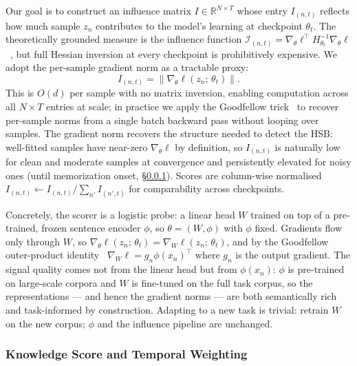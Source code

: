 \begin{foldable} %
	Our goal is to construct an influence matrix $I \in \mathbb{R}^{N \times T}$ whose entry $I_{(n,t)}$ reflects how much sample $z_n$ contributes to the model's learning at checkpoint $\theta_t$.
	The theoretically grounded measure is the influence function $\mathcal{I}_{(n,t)} = \nabla_\theta \ell^\top H_{\theta_t}^{-1} \nabla_\theta \ell$~\cite{koh2017understanding}, but full Hessian inversion at every checkpoint is prohibitively expensive.
	We adopt the per-sample gradient norm as a tractable proxy:
	\begin{equation}
		I_{(n,t)} = \|\nabla_\theta \ell(z_n;\,\theta_t)\|.
		\label{ch5:eq:influence-matrix}
	\end{equation}
	This is $O(d)$ per sample with no matrix inversion, enabling computation across all $N \times T$ entries at scale; in practice we apply the Goodfellow trick~\cite{goodfellow2015efficient} to recover per-sample norms from a single batch backward pass without looping over samples.
	The gradient norm recovers the structure needed to detect the HSB: well-fitted samples have near-zero $\nabla_\theta \ell$ by definition, so $I_{(n,t)}$ is naturally low for clean and moderate samples at convergence and persistently elevated for noisy ones (until memorization onset, \S\ref{ch5:sec:04-gradient-kappa}).
	Scores are column-wise normalised $I_{(n,t)} \leftarrow I_{(n,t)} / \sum_{n'} I_{(n',t)}$ for comparability across checkpoints.

	Concretely, the scorer is a logistic probe: a linear head $W$ trained on top of a pre-trained, frozen sentence encoder $\phi$, so $\theta = (W, \phi)$ with $\phi$ fixed.
	Gradients flow only through $W$, so $\nabla_\theta \ell(z_n;\,\theta_t) = \nabla_W \ell(z_n;\,\theta_t)$, and by the Goodfellow outer-product identity~\cite{goodfellow2015efficient} $\nabla_W \ell = g_n \phi(x_n)^\top$ where $g_n$ is the output gradient.
	The signal quality comes not from the linear head but from $\phi(x_n)$: $\phi$ is pre-trained on large-scale corpora and $W$ is fine-tuned on the full task corpus, so the representations --- and hence the gradient norms --- are both semantically rich and task-informed by construction.
	Adapting to a new task is trivial: retrain $W$ on the new corpus; $\phi$ and the influence pipeline are unchanged.
\end{foldable}

\subsubsection{Knowledge Score and Temporal Weighting} \label{ch5:sec:04-gradient-kappa}


